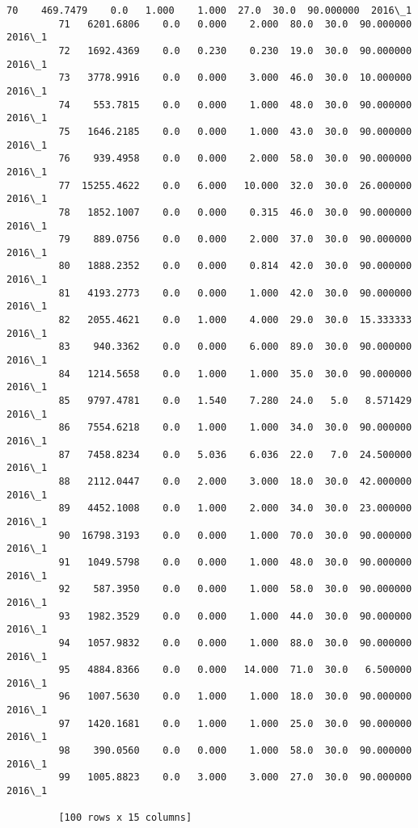 \documentclass[11pt]{article}
\begin{document}
\begin{Verbatim}[commandchars=\\\{\}]
         70    469.7479    0.0   1.000    1.000  27.0  30.0  90.000000  2016\_1  
         71   6201.6806    0.0   0.000    2.000  80.0  30.0  90.000000  2016\_1  
         72   1692.4369    0.0   0.230    0.230  19.0  30.0  90.000000  2016\_1  
         73   3778.9916    0.0   0.000    3.000  46.0  30.0  10.000000  2016\_1  
         74    553.7815    0.0   0.000    1.000  48.0  30.0  90.000000  2016\_1  
         75   1646.2185    0.0   0.000    1.000  43.0  30.0  90.000000  2016\_1  
         76    939.4958    0.0   0.000    2.000  58.0  30.0  90.000000  2016\_1  
         77  15255.4622    0.0   6.000   10.000  32.0  30.0  26.000000  2016\_1  
         78   1852.1007    0.0   0.000    0.315  46.0  30.0  90.000000  2016\_1  
         79    889.0756    0.0   0.000    2.000  37.0  30.0  90.000000  2016\_1  
         80   1888.2352    0.0   0.000    0.814  42.0  30.0  90.000000  2016\_1  
         81   4193.2773    0.0   0.000    1.000  42.0  30.0  90.000000  2016\_1  
         82   2055.4621    0.0   1.000    4.000  29.0  30.0  15.333333  2016\_1  
         83    940.3362    0.0   0.000    6.000  89.0  30.0  90.000000  2016\_1  
         84   1214.5658    0.0   1.000    1.000  35.0  30.0  90.000000  2016\_1  
         85   9797.4781    0.0   1.540    7.280  24.0   5.0   8.571429  2016\_1  
         86   7554.6218    0.0   1.000    1.000  34.0  30.0  90.000000  2016\_1  
         87   7458.8234    0.0   5.036    6.036  22.0   7.0  24.500000  2016\_1  
         88   2112.0447    0.0   2.000    3.000  18.0  30.0  42.000000  2016\_1  
         89   4452.1008    0.0   1.000    2.000  34.0  30.0  23.000000  2016\_1  
         90  16798.3193    0.0   0.000    1.000  70.0  30.0  90.000000  2016\_1  
         91   1049.5798    0.0   0.000    1.000  48.0  30.0  90.000000  2016\_1  
         92    587.3950    0.0   0.000    1.000  58.0  30.0  90.000000  2016\_1  
         93   1982.3529    0.0   0.000    1.000  44.0  30.0  90.000000  2016\_1  
         94   1057.9832    0.0   0.000    1.000  88.0  30.0  90.000000  2016\_1  
         95   4884.8366    0.0   0.000   14.000  71.0  30.0   6.500000  2016\_1  
         96   1007.5630    0.0   1.000    1.000  18.0  30.0  90.000000  2016\_1  
         97   1420.1681    0.0   1.000    1.000  25.0  30.0  90.000000  2016\_1  
         98    390.0560    0.0   0.000    1.000  58.0  30.0  90.000000  2016\_1  
         99   1005.8823    0.0   3.000    3.000  27.0  30.0  90.000000  2016\_1  
         
         [100 rows x 15 columns]
\end{Verbatim}
            
\end{document}
